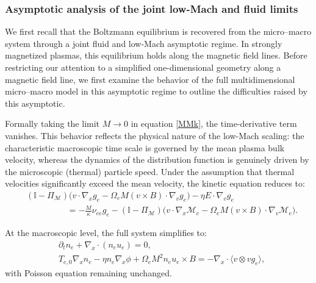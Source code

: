 \documentclass[pdflatex,final,10pt]{article}
\begin{document}
\subsubsection{Asymptotic analysis of the joint low-Mach and fluid limits}

We first recall that the Boltzmann equilibrium is recovered from the micro--macro system through a joint fluid and low-Mach asymptotic regime. In strongly magnetized plasmas, this equilibrium holds along the magnetic field lines. Before restricting our attention to a simplified one-dimensional geometry along a magnetic field line, we first examine the behavior of the full multidimensional micro--macro model in this asymptotic regime to outline the difficulties raised by this asymptotic.

Formally taking the limit $M \to 0$ in equation \eqref{MMk}, the time-derivative term vanishes. This behavior reflects the physical nature of the low-Mach scaling: the characteristic macroscopic time scale is governed by the mean plasma bulk velocity, whereas the dynamics of the distribution function is genuinely driven by the microscopic (thermal) particle speed. Under the assumption that thermal velocities significantly exceed the mean velocity, the kinetic equation reduces to:
\begin{equation*}
\begin{split}
    &(\mathbb{I}-\Pi_{\mathcal{M}})\big(v\cdot\nabla_x g_e - \Omega_e M (v\times B)\cdot\nabla_v g_e\big) - \eta E\cdot\nabla_v g_e \\
    &\hspace{2cm} = -\frac{M}{\kappa}\nu_{ee}g_e - (\mathbb{I}-\Pi_{\mathcal{M}})\big(v\cdot\nabla_x\mathcal{M}_e - \Omega_e M (v\times B)\cdot\nabla_v\mathcal{M}_e\big).
\end{split}
\end{equation*}

At the macroscopic level, the full system simplifies to:
\begin{align*}
    &\partial_{t}{n_e} + \nabla_{x}\cdot(n_e u_e) = 0, \\
    &T_{e,0}\nabla_{x}n_e - \eta n_e\nabla_{x}\phi + \Omega_{e}M^{2}n_e u_e\times B = -\nabla_{x}\cdot\langle v\otimes v g_{e}\rangle,
\end{align*}
with Poisson equation remaining unchanged.
\end{document}
